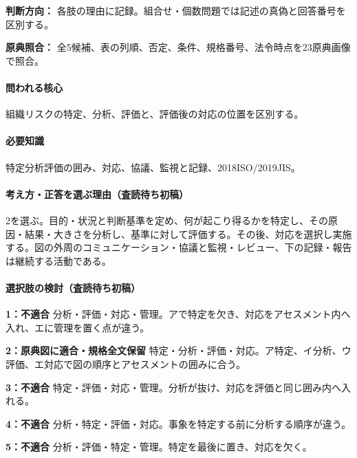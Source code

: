 \noindent\textbf{判断方向：} 各肢の理由に記録。組合せ・個数問題では記述の真偽と回答番号を区別する。\par

\noindent\textbf{原典照合：} 全5候補、表の列順、否定、条件、規格番号、法令時点を23原典画像で照合。\par

\paragraph{問われる核心} 組織リスクの特定、分析、評価と、評価後の対応の位置を区別する。

\paragraph{必要知識} 特定分析評価の囲み、対応、協議、監視と記録、2018ISO/2019JIS。

\paragraph{考え方・正答を選ぶ理由（査読待ち初稿）} 2を選ぶ。目的・状況と判断基準を定め、何が起こり得るかを特定し、その原因・結果・大きさを分析し、基準に対して評価する。その後、対応を選択し実施する。図の外周のコミュニケーション・協議と監視・レビュー、下の記録・報告は継続する活動である。

\paragraph{選択肢の検討（査読待ち初稿）}\mbox{}\par

\noindent\textbf{1：不適合} 分析・評価・対応・管理。アで特定を欠き、対応をアセスメント内へ入れ、エに管理を置く点が違う。\par

\noindent\textbf{2：原典図に適合・規格全文保留} 特定・分析・評価・対応。ア特定、イ分析、ウ評価、エ対応で図の順序とアセスメントの囲みに合う。\par

\noindent\textbf{3：不適合} 特定・評価・対応・管理。分析が抜け、対応を評価と同じ囲み内へ入れる。\par

\noindent\textbf{4：不適合} 分析・特定・評価・対応。事象を特定する前に分析する順序が違う。\par

\noindent\textbf{5：不適合} 分析・評価・特定・管理。特定を最後に置き、対応を欠く。\par


